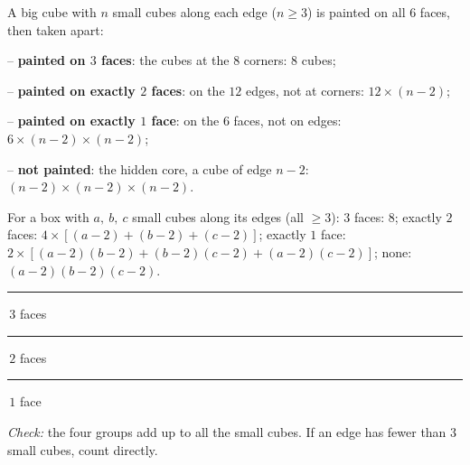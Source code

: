 \begin{knowbox}
\begin{minipage}[t]{0.6\linewidth}
A big cube with $n$ small cubes along each edge ($n\ge3$) is painted on all $6$ faces, then taken apart:\par
\smallskip
-- \textbf{painted on $3$ faces}: the cubes at the $8$ corners: $8$ cubes;\par
-- \textbf{painted on exactly $2$ faces}: on the $12$ edges, not at corners: $12\times(n-2)$;\par
-- \textbf{painted on exactly $1$ face}: on the $6$ faces, not on edges: $6\times(n-2)\times(n-2)$;\par
-- \textbf{not painted}: the hidden core, a cube of edge $n-2$: $(n-2)\times(n-2)\times(n-2)$.\par
\smallskip
For a box with $a,\ b,\ c$ small cubes along its edges (all $\ge3$): $3$ faces: $8$; exactly $2$ faces: $4\times[(a-2)+(b-2)+(c-2)]$; exactly $1$ face: $2\times[(a-2)(b-2)+(b-2)(c-2)+(a-2)(c-2)]$; none: $(a-2)(b-2)(c-2)$.
\end{minipage}\hfill
\begin{minipage}[t]{0.37\linewidth}\vspace{4pt}\centering
{}\par\smallskip
{\scriptsize\textcolor{tmOrange}{\rule{6pt}{6pt}}\,$3$ faces\quad\textcolor{tmGreen}{\rule{6pt}{6pt}}\,$2$ faces\quad\textcolor{tmBlue}{\rule{6pt}{6pt}}\,$1$ face}
\end{minipage}\par
\smallskip
\emph{Check:} the four groups add up to all the small cubes. If an edge has fewer than $3$ small cubes, count directly.
\end{knowbox}

